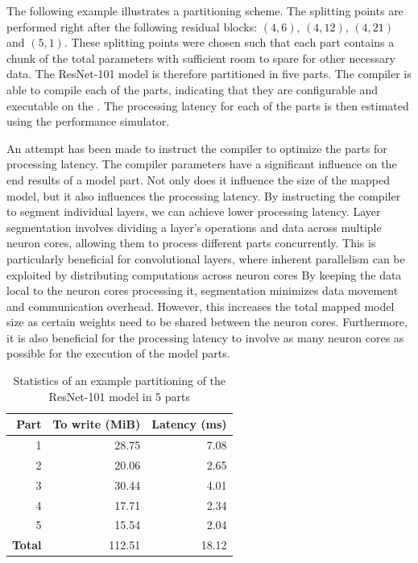 The following example illustrates a partitioning scheme.
The splitting points are performed right after the following residual blocks: $(4, 6)$, $(4, 12)$, $(4,21)$ and $(5,1)$.
These splitting points were chosen such that each part contains a chunk of the total parameters with sufficient room to spare for other necessary data.
The ResNet-101 model is therefore partitioned in five parts.
The compiler is able to compile each of the parts, indicating that they are configurable and executable on the \graicore{}.
The processing latency for each of the parts is then estimated using the performance simulator.

An attempt has been made to instruct the compiler to optimize the parts for processing latency.
The compiler parameters have a significant influence on the end results of a model part.
Not only does it influence the size of the mapped model, but it also influences the processing latency.
By instructing the compiler to segment individual layers, we can achieve lower processing latency.
Layer segmentation involves dividing a layer's operations and data across multiple neuron cores, allowing them to process different parts concurrently.
This is particularly beneficial for convolutional layers, where inherent parallelism can be exploited by distributing computations across neuron cores
By keeping the data local to the neuron cores processing it, segmentation minimizes data movement and communication overhead.
However, this increases the total mapped model size as certain weights need to be shared between the neuron cores.
Furthermore, it is also beneficial for the processing latency to involve as many neuron cores as possible for the execution of the model parts.

\begin{table}[hbtp]
\centering
\begin{tabular}{@{}rrr@{}}
\toprule
\textbf{Part}  & \textbf{To write (MiB)} & \textbf{Latency (ms)} \\ \midrule
1              & 28.75                   & 7.08                  \\
2              & 20.06                   & 2.65                  \\
3              & 30.44                   & 4.01                  \\
4              & 17.71                   & 2.34                  \\
5              & 15.54                   & 2.04                  \\ \midrule
\textbf{Total} & 112.51                  & 18.12                 \\ \bottomrule
\end{tabular}
\caption{Statistics of an example partitioning of the ResNet-101 model in 5 parts}
\label{tab:resnet101_5parts}
\end{table}

